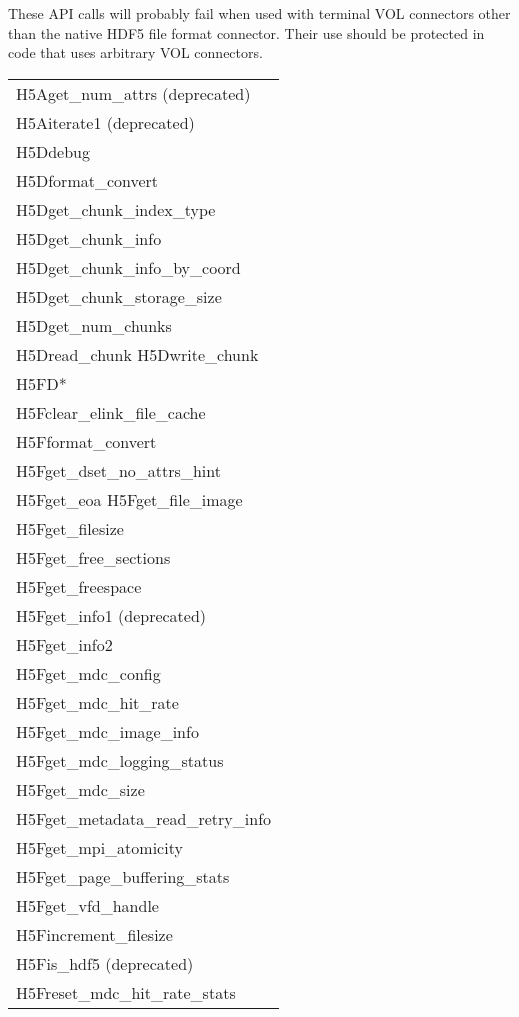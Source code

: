 These API calls will probably fail when used with terminal VOL connectors other than the native HDF5 file format connector. Their use should be protected in code that uses arbitrary VOL connectors.
\begin{longtable}{ |>{\raggedright\arraybackslash}p{\linewidth}| }
    \hline
    H5Aget\_num\_attrs (deprecated) \\
    H5Aiterate1 (deprecated) \\
    \hline
    H5Ddebug \\
    H5Dformat\_convert \\
    H5Dget\_chunk\_index\_type \\
    H5Dget\_chunk\_info \\
    H5Dget\_chunk\_info\_by\_coord \\
    H5Dget\_chunk\_storage\_size \\
    H5Dget\_num\_chunks \\
    H5Dread\_chunk H5Dwrite\_chunk \\
    \hline
    H5FD* \\
    \hline
    H5Fclear\_elink\_file\_cache \\
    H5Fformat\_convert \\
    H5Fget\_dset\_no\_attrs\_hint \\
    H5Fget\_eoa H5Fget\_file\_image \\
    H5Fget\_filesize \\
    H5Fget\_free\_sections \\
    H5Fget\_freespace \\
    H5Fget\_info1 (deprecated) \\
    H5Fget\_info2 \\
    H5Fget\_mdc\_config \\
    H5Fget\_mdc\_hit\_rate \\
    H5Fget\_mdc\_image\_info \\
    H5Fget\_mdc\_logging\_status \\
    H5Fget\_mdc\_size \\
    H5Fget\_metadata\_read\_retry\_info \\
    H5Fget\_mpi\_atomicity \\
    H5Fget\_page\_buffering\_stats \\
    H5Fget\_vfd\_handle \\
    H5Fincrement\_filesize \\
    H5Fis\_hdf5 (deprecated) \\
    H5Freset\_mdc\_hit\_rate\_stats \\

\end{longtable}
